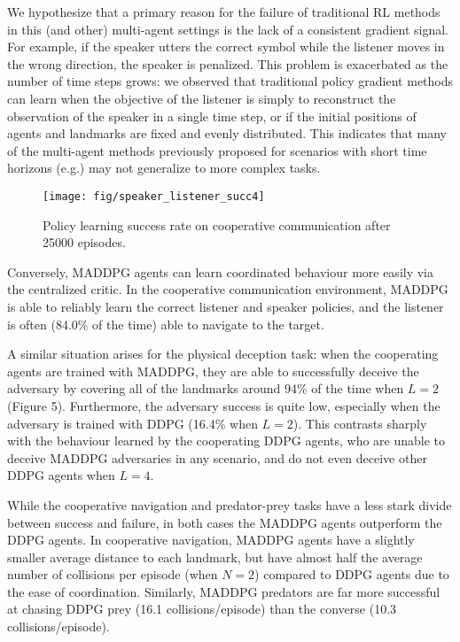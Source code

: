 \documentclass{article}
\begin{document}
We hypothesize that a primary reason for the failure of traditional RL methods in this (and other) multi-agent settings is the lack of a consistent gradient signal. For example, if the speaker utters the correct symbol while the listener moves in the wrong direction, the speaker is penalized. This problem is exacerbated as the number of time steps grows: we observed that traditional policy gradient methods can learn when the objective of the listener is simply to reconstruct the observation of the speaker in a single time step, or if the initial positions of agents and landmarks are fixed and evenly distributed. This indicates that many of the multi-agent methods previously proposed for scenarios with short time horizons (e.g.\@ \cite{lazaridou2016multi}) may not generalize to more complex tasks.



\begin{wrapfigure}{l}{0.5\textwidth}
\centering
\texttt{[image: fig/speaker\_listener\_succ4]}
\caption{\label{fig:comm_succ} Policy learning success rate on cooperative communication after 25000 episodes. \vspace{-4mm}}
\end{wrapfigure}
Conversely, MADDPG agents can learn coordinated behaviour more easily via the centralized critic. In the cooperative communication environment, MADDPG is able to reliably learn the correct listener and speaker policies, and the listener is often (84.0\% of the time) able to navigate to the target.

A similar situation arises for the physical deception task: when the cooperating agents are trained with MADDPG, they are able to successfully deceive the adversary by covering all of the landmarks around 94\% of the time when $L=2$ (Figure 5). Furthermore, the adversary success is quite low, especially when the adversary is trained with DDPG (16.4\% when $L=2$). This contrasts sharply with the behaviour learned by the cooperating DDPG agents, who are unable to deceive MADDPG adversaries in any scenario, and do not even deceive other DDPG agents when $L=4$.

While the cooperative navigation and predator-prey tasks have a less stark divide between success and failure, in both cases the MADDPG agents outperform the DDPG agents. In cooperative navigation, MADDPG agents have a slightly smaller average distance to each landmark, but have almost half the average number of collisions per episode (when $N=2$) compared to DDPG agents due to the ease of coordination. Similarly, MADDPG predators are far more successful at chasing DDPG prey (16.1 collisions/episode) than the converse (10.3 collisions/episode).
\end{document}
